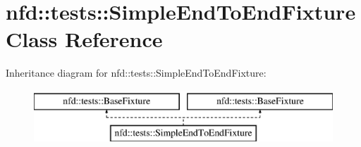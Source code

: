 \hypertarget{classnfd_1_1tests_1_1SimpleEndToEndFixture}{}\section{nfd\+:\+:tests\+:\+:Simple\+End\+To\+End\+Fixture Class Reference}
\label{classnfd_1_1tests_1_1SimpleEndToEndFixture}
Inheritance diagram for nfd\+:\+:tests\+:\+:Simple\+End\+To\+End\+Fixture\+:\begin{figure}[H]
\begin{center}
\leavevmode
\includegraphics[height=2.000000cm]{classnfd_1_1tests_1_1SimpleEndToEndFixture}
\end{center}
\end{figure}

